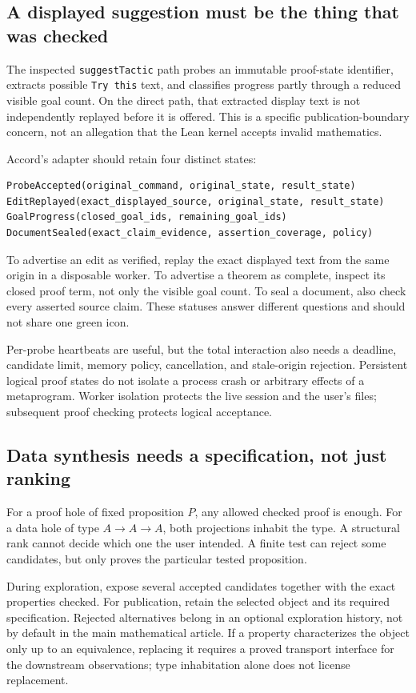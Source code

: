 \documentclass[11pt,letterpaper]{article}
\newcommand{\code}[1]{\nolinkurl{#1}}
\theoremstyle{definition}
\begin{document}
\subsection{A displayed suggestion must be the thing that was checked}
The inspected \code{suggestTactic} path probes an immutable proof-state identifier,
extracts possible \code{Try this} text, and classifies progress partly through a
reduced visible goal count. On the direct path, that extracted display text is not
independently replayed before it is offered\cite{lmain}. This is a specific
publication-boundary concern, not an allegation that the Lean kernel accepts
invalid mathematics.

Accord's adapter should retain four distinct states:
\begin{lstlisting}
ProbeAccepted(original_command, original_state, result_state)
EditReplayed(exact_displayed_source, original_state, result_state)
GoalProgress(closed_goal_ids, remaining_goal_ids)
DocumentSealed(exact_claim_evidence, assertion_coverage, policy)
\end{lstlisting}

To advertise an edit as verified, replay the exact displayed text from the same
origin in a disposable worker. To advertise a theorem as complete, inspect its
closed proof term, not only the visible goal count. To seal a document, also check
every asserted source claim. These statuses answer different questions and should
not share one green icon.

Per-probe heartbeats are useful, but the total interaction also needs a deadline,
candidate limit, memory policy, cancellation, and stale-origin rejection. Persistent
logical proof states do not isolate a process crash or arbitrary effects of a
metaprogram. Worker isolation protects the live session and the user's files;
subsequent proof checking protects logical acceptance.

\subsection{Data synthesis needs a specification, not just ranking}
For a proof hole of fixed proposition \(P\), any allowed checked proof is enough.
For a data hole of type \(A\to A\to A\), both projections inhabit the type.
A structural rank cannot decide which one the user intended. A finite test can
reject some candidates, but only proves the particular tested proposition.

During exploration, expose several accepted candidates together with the exact
properties checked. For publication, retain the selected object and its required
specification. Rejected alternatives belong in an optional exploration history,
not by default in the main mathematical article. If a property characterizes the
object only up to an equivalence, replacing it requires a proved transport
interface for the downstream observations; type inhabitation alone does not
license replacement.
\end{document}
